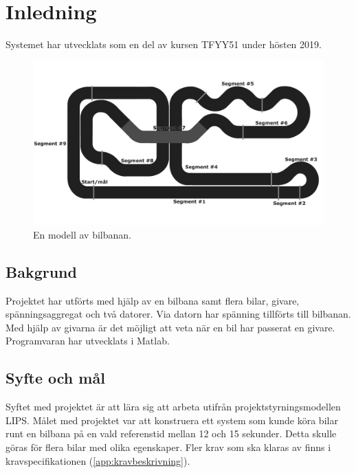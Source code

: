 \section{Inledning}
Systemet har utvecklats som en del av kursen TFYY51 under hösten 2019.  

\begin{figure}
	\centering
	\includegraphics[width=\linewidth] {Figures/BanaModell}
	\caption{En modell av bilbanan.}
	\label{fig:bilbanan}
\end{figure} 

\subsection{Bakgrund} 

Projektet har utförts med hjälp av en bilbana samt flera bilar, givare,
spänningsaggregat och två datorer. Via datorn har spänning
tillförts till bilbanan. Med hjälp av givarna är det möjligt att veta när en bil
har passerat en givare. Programvaran har utvecklats i Matlab.

\subsection{Syfte och mål}

Syftet med projektet är att lära sig att arbeta utifrån
projektstyrningsmodellen LIPS. Målet med projektet var att konstruera ett system
som kunde köra bilar runt en bilbana på en vald referenstid mellan 12 och 15
sekunder. Detta skulle göras för flera bilar med olika egenskaper. Fler krav som
ska klaras av finns i kravspecifikationen (\ref{app:kravbeskrivning}).

